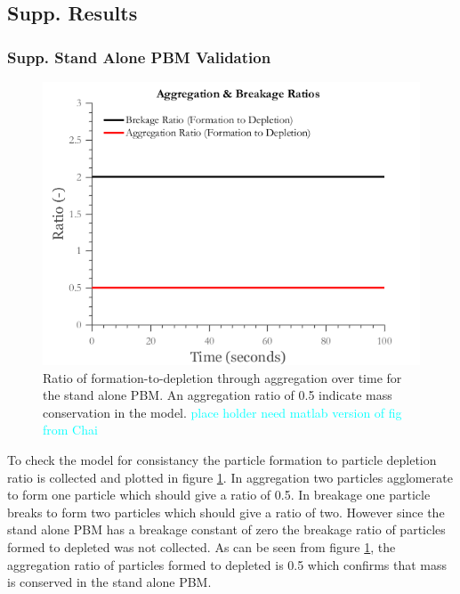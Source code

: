 \subsection{Supp. Results}


\subsubsection{Supp. Stand Alone PBM Validation}

\begin{figure}[H]
\centering
\includegraphics[scale=0.5]{rslts_anik_pbm_ratios}
\caption{Ratio of formation-to-depletion through aggregation over time for the stand alone PBM. An aggregation ratio of 0.5 indicate mass conservation in the model. \textcolor{cyan}{place holder need matlab version of fig from Chai} }
\label{fig:rslts_anik_pbm_ratios}
\end{figure}

\par To check the model for consistancy the particle formation to particle depletion ratio is collected and plotted in figure \ref{fig:rslts_anik_pbm_ratios}. In aggregation two particles agglomerate to form one particle which should give a ratio of 0.5. In breakage one particle breaks to form two particles which should give a ratio of two. However since the stand alone PBM has a breakage constant of zero the breakage ratio of particles formed to depleted was not collected. As can be seen from figure \ref{fig:rslts_anik_pbm_ratios}, the aggregation ratio of particles formed to depleted is 0.5 which confirms that mass is conserved in the stand alone PBM.

